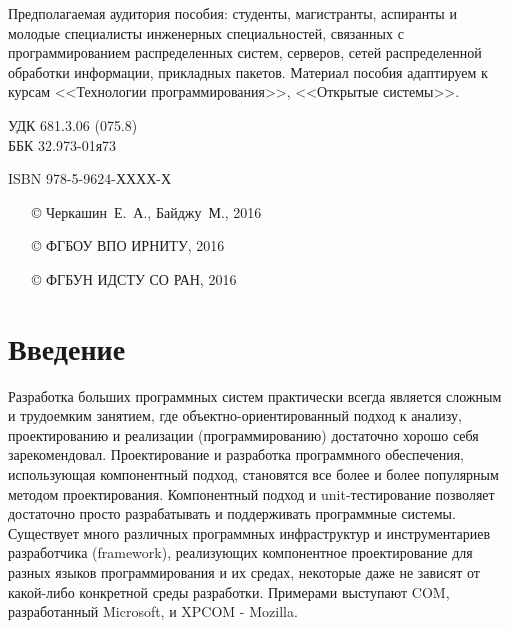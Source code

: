 \documentclass[a4paper,openany,twoside,draft]{book}
\newcommand\e[1]{#1}
\begin{document}
\begin{mygroup}
\begin{minipage}[t]{0.95\linewidth}
Предполагаемая аудитория пособия: студенты, магистранты, аспиранты и молодые специалисты инженерных специальностей, связанных с программированием распределенных систем, серверов, сетей распределенной обработки информации, прикладных пакетов. Материал пособия адаптируем к курсам <<Технологии программирования>>, <<Открытые системы>>.

\mbox{}
\endgroup
\end{minipage}
\mbox{}\hspace{0.7\linewidth}
\begin{minipage}{0.3\linewidth}\small
\noindent УДК 681.3.06 (075.8)\\
\noindent ББК 32.973-01я73
\end{minipage}
\vfill
\vfill
\noindent\begin{minipage}[t]{0.35\linewidth}\small
\noindent \e{ISBN 978-5-9624-ХХХХ-Х}
\end{minipage}%
\begin{minipage}[t]{0.65\linewidth}\small
\begin{itemize}
\setlength{\itemsep}{-0.5ex}
\setlength{\parsep}{0pt}
\item[\copyright{}] Черкашин~Е.~А., Байджу~М., 2016
\item[\copyright{}] ФГБОУ ВПО ИРНИТУ, 2016
\item[\copyright{}] ФГБУН ИДСТУ СО РАН, 2016
\end{itemize}
\end{minipage}
\end{mygroup}
\newpage{}
\label{contents}
\tableofcontents



\chapter{Введение%
  \label{id1}%
}



Разработка больших программных систем практически всегда является
сложным и трудоемким занятием, где объектно-ориентированный подход к
анализу, проектированию и реализации (программированию) достаточно
хорошо себя зарекомендовал.  Проектирование и разработка программного
обеспечения, использующая компонентный подход, становятся все более и
более популярным методом проектирования.  Компонентный подход и
unit-тестирование позволяет достаточно просто разрабатывать и
поддерживать программные системы.  Существует много различных
программных инфраструктур и инструментариев разработчика (framework),
реализующих компонентное проектирование для разных языков
программирования и их средах, некоторые даже не зависят от какой-либо
конкретной среды разработки.  Примерами выступают COM, разработанный
Microsoft, и XPCOM - Mozilla.
\end{document}
